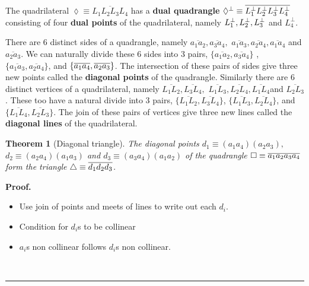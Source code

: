 \documentclass{unswthesis}
\newtheorem{theorem}{Theorem}
\newenvironment{proof}[1][Proof]{\noindent\textbf{#1.} }{\ \rule{0.5em}{0.5em}}
\begin{document}
The quadrilateral $\lozenge\equiv \overline{L_{1}L_{2}L_{3}L_{4}}$ has a 
\textbf{dual quadrangle} $\lozenge^{\perp}\equiv\overline{%
L_{1}^{\perp}L_{2}^{\perp}L_{3}^{\perp}L_{4}^{\perp}}$ consisting of four 
\textbf{dual points} of the quadrilateral, namely $L_{1}^{\perp},L_{2}^{%
\perp},L_{3}^{\perp}$ and $L_{4}^{\perp}$.\newline

There are 6 distinct sides of a quadrangle, namely $\overline{a_{1}a_{2}},%
\overline{a_{3}a_{4}},$ $\overline{a_{1}a_{3}},\overline{a_{2}a_{4}},%
\overline{a_{1}a_{4}}$ and $\overline{a_{2}a_{3}}$. We can naturally divide
these 6 sides into 3 pairs, $\{\overline{a_{1}a_{2}},\overline{a_{3}a_{4}}\}$%
, $\{\overline{a_{1}a_{3}},\overline{a_{2}a_{4}}\}$, and $\{\overline{%
a_{1}a_{4}},\overline{a_{2}a_{3}}\}$. The intersection of these pairs of
sides give three new points called the \textbf{diagonal points} of the
quadrangle.\newline
Similarly there are 6 distinct vertices of a quadrilateral, namely $%
\overline{L_{1}L_{2}},\overline{L_{3}L_{4}},$ $\overline{L_{1}L_{3}},%
\overline{L_{2}L_{4}},\overline{L_{1}L_{4}}$and $\overline{L_{2}L_{3}}$.
These too have a natural divide into 3 pairs, $\{\overline{L_{1}L_{2}},%
\overline{L_{3}L_{4}}\}$, $\{\overline{L_{1}L_{3}},\overline{L_{2}L_{4}}\}$,
and $\{\overline{L_{1}L_{4}},\overline{L_{2}L_{3}}\}$. The join of these
pairs of vertices give three new lines called the \textbf{diagonal lines} of
the quadrilateral.\newline

\begin{theorem}[Diagonal triangle]
The diagonal points $d_{1}\equiv(a_{1}a_{4})(a_{2}a_{3}),$\newline
$d_{2}\equiv(a_{2}a_{4})(a_{1}a_{3})$ and $d_{3}%
\equiv(a_{3}a_{4})(a_{1}a_{2})$ of the quadrangle $\square\equiv\overline{%
a_{1}a_{2}a_{3}a_{4}}$ form the triangle $\triangle\equiv\overline{%
d_{1}d_{2}d_{3}}$.
\end{theorem}

\begin{proof}
\begin{itemize}
\item Use join of points and meets of lines to write out each $d_{i}$.

\item Condition for $d_{i}$s to be collinear

\item $a_{i}$s non collinear follows $d_{i}$s non collinear.
\end{itemize}
\end{proof}
\end{document}
